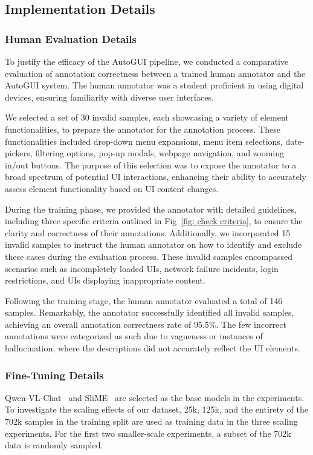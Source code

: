 \subsection{Implementation Details}
\subsubsection{Human Evaluation Details}
\label{sec:supp:humaneval details}
To justify the efficacy of the AutoGUI pipeline, we conducted a comparative evaluation of annotation correctness between a trained human annotator and the AutoGUI system. The human annotator was a student proficient in using digital devices, ensuring familiarity with diverse user interfaces.

We selected a set of 30 invalid samples, each showcasing a variety of element functionalities, to prepare the annotator for the annotation process. These functionalities included drop-down menu expansions, menu item selections, date-pickers, filtering options, pop-up modals, webpage navigation, and zooming in/out buttons. The purpose of this selection was to expose the annotator to a broad spectrum of potential UI interactions, enhancing their ability to accurately assess element functionality based on UI content changes.

During the training phase, we provided the annotator with detailed guidelines, including three specific criteria outlined in Fig~\ref{fig: check criteria}, to ensure the clarity and correctness of their annotations. Additionally, we incorporated 15 invalid samples to instruct the human annotator on how to identify and exclude these cases during the evaluation process. These invalid samples encompassed scenarios such as incompletely loaded UIs, network failure incidents, login restrictions, and UIs displaying inappropriate content.

Following the training stage, the human annotator evaluated a total of 146 samples. Remarkably, the annotator successfully identified all invalid samples, achieving an overall annotation correctness rate of 95.5\%. The few incorrect annotations were categorized as such due to vagueness or instances of hallucination, where the descriptions did not accurately reflect the UI elements.

\subsubsection{Fine-Tuning Details}
\label{sec:supp:impl details}
Qwen-VL-Chat~\cite{bai2023qwen} and SliME~\cite{slime} are selected as the base models in the experiments. To investigate the scaling effects of our dataset, 25k, 125k, and the entirety of the 702k samples in the training split are used as training data in the three scaling experiments. For the first two smaller-scale experiments, a subset of the 702k data is randomly sampled.


